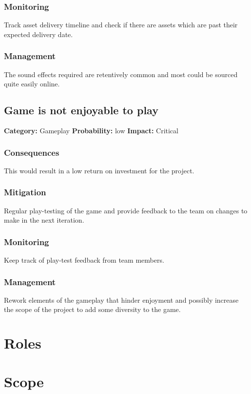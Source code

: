\documentclass[a4paper,10pt]{article}
\begin{document}
\subsubsection*{Monitoring}
Track asset delivery timeline and check if there are assets which are past their expected delivery date.
\subsubsection*{Management}
The sound effects required are retentively common and most could be sourced quite easily online.

\subsection{Game is not enjoyable to play}
\textbf{Category:} Gameplay\newline
\textbf{Probability:} low\newline
\textbf{Impact:} Critical
\subsubsection*{Consequences}
This would result in a low return on investment for the project.
\subsubsection*{Mitigation}
Regular play-testing of the game and provide feedback to the team on changes to make in the next iteration.
\subsubsection*{Monitoring}
Keep track of play-test feedback from team members.
\subsubsection*{Management}
Rework elements of the gameplay that hinder enjoyment and possibly increase the scope of the project to add some diversity to the game. 

\section{Roles}

\section{Scope}
\end{document}
